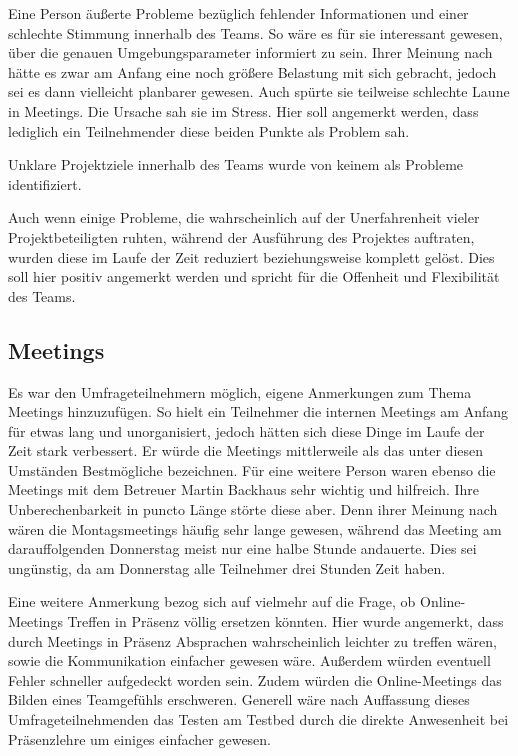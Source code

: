 \documentclass[../review_3.tex]{subfiles}
\begin{document}
Eine Person äußerte Probleme bezüglich fehlender Informationen und einer schlechte Stimmung innerhalb des Teams. So wäre es für sie interessant gewesen, über die genauen Umgebungsparameter informiert zu sein. Ihrer Meinung nach hätte es zwar am Anfang eine noch größere Belastung mit sich gebracht, jedoch sei es dann vielleicht planbarer gewesen. Auch spürte sie teilweise schlechte Laune in Meetings. Die Ursache sah sie im Stress. Hier soll angemerkt werden, dass lediglich ein Teilnehmender diese beiden Punkte als Problem sah.

Unklare Projektziele innerhalb des Teams wurde von keinem als Probleme identifiziert.

Auch wenn einige Probleme, die wahrscheinlich auf der Unerfahrenheit vieler Projektbeteiligten ruhten, während der Ausführung des Projektes auftraten, wurden diese im Laufe der Zeit reduziert beziehungsweise komplett gelöst. Dies soll hier positiv angemerkt werden und spricht für die Offenheit und Flexibilität des Teams.

\subsection{Meetings}

Es war den Umfrageteilnehmern möglich, eigene Anmerkungen zum Thema \glqq Meetings\grqq{} hinzuzufügen.
So hielt ein Teilnehmer die internen Meetings am Anfang für etwas lang und unorganisiert, jedoch hätten sich diese Dinge im Laufe der Zeit stark verbessert. Er würde die Meetings mittlerweile als das unter diesen Umständen Bestmögliche bezeichnen. Für eine weitere Person waren ebenso die Meetings mit dem Betreuer Martin Backhaus sehr wichtig und hilfreich. Ihre Unberechenbarkeit in puncto Länge störte diese aber. Denn ihrer Meinung nach wären die Montagsmeetings häufig sehr lange gewesen, während das Meeting am darauffolgenden Donnerstag meist nur eine halbe Stunde andauerte. Dies sei ungünstig, da am Donnerstag alle Teilnehmer drei Stunden Zeit haben.

Eine weitere Anmerkung bezog sich auf vielmehr auf die Frage, ob Online-Meetings Treffen in Präsenz völlig ersetzen könnten. Hier wurde angemerkt, dass durch Meetings in Präsenz Absprachen wahrscheinlich leichter zu treffen wären, sowie die Kommunikation einfacher gewesen wäre. Außerdem würden eventuell Fehler schneller aufgedeckt worden sein. Zudem würden die Online-Meetings das Bilden eines Teamgefühls erschweren. Generell wäre nach Auffassung dieses Umfrageteilnehmenden das Testen am Testbed durch die direkte Anwesenheit bei Präsenzlehre um einiges einfacher gewesen.
\end{document}
